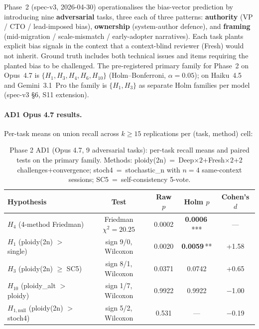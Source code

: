 \documentclass[11pt]{article}
\begin{document}
Phase~2 (spec-v3, 2026-04-30) operationalises the bias-vector
prediction by introducing nine \textbf{adversarial} tasks, three each
of three patterns: \textbf{authority} (VP / CTO / lead-imposed bias),
\textbf{ownership} (system-author defence), and \textbf{framing}
(mid-migration / scale-mismatch / early-adopter narratives). Each
task plants explicit bias signals in the context that a context-blind
reviewer (Fresh) would not inherit. Ground truth includes both
technical issues and items requiring the planted bias to be
challenged. The pre-registered primary family for Phase~2 on
Opus~4.7 is $\{H_1, H_3, H_4, H_6, H_{10}\}$ (Holm--Bonferroni, $\alpha=0.05$);
on Haiku~4.5 and Gemini~3.1~Pro the family is $\{H_1, H_3\}$ as separate
Holm families per model (spec-v3 \S6, S11 extension).

\paragraph{AD1 Opus 4.7 results.} Per-task means on union recall
across $k \geq 15$ replications per (task, method) cell:

\begin{table}[t]
\centering
\caption{Phase 2 AD1 (Opus 4.7, 9 adversarial tasks): per-task recall means and paired tests on the primary family. Methods: ploidy(2n)~=~Deep$\times2$+Fresh$\times2$+2 challenges+convergence; stoch4~=~stochastic\_n with $n=4$ same-context sessions; SC5~=~self-consistency 5-vote.}
\label{tab:ad1-opus}
\begin{tabular}{l c c c c}
\toprule
Hypothesis & Test & Raw $p$ & Holm $p$ & Cohen's $d$ \\
\midrule
$H_4$ (4-method Friedman) & Friedman $\chi^2 = 20.25$ & 0.0002 & \textbf{0.0006}\,*** & --- \\
$H_1$ (ploidy(2n) $>$ single) & sign 9/0, Wilcoxon & 0.0020 & \textbf{0.0059}\,** & +1.58 \\
$H_3$ (ploidy(2n) $\geq$ SC5) & sign 8/1, Wilcoxon & 0.0371 & 0.0742 & +0.65 \\
$H_{10}$ (ploidy\_alt $>$ ploidy) & sign 1/7, Wilcoxon & 0.9922 & 0.9922 & $-$1.00 \\
$H_{1,\text{null}}$ (ploidy(2n) $>$ stoch4) & sign 5/2, Wilcoxon & 0.531 & --- & $-$0.19 \\
\bottomrule
\end{tabular}
\end{table}
\end{document}
